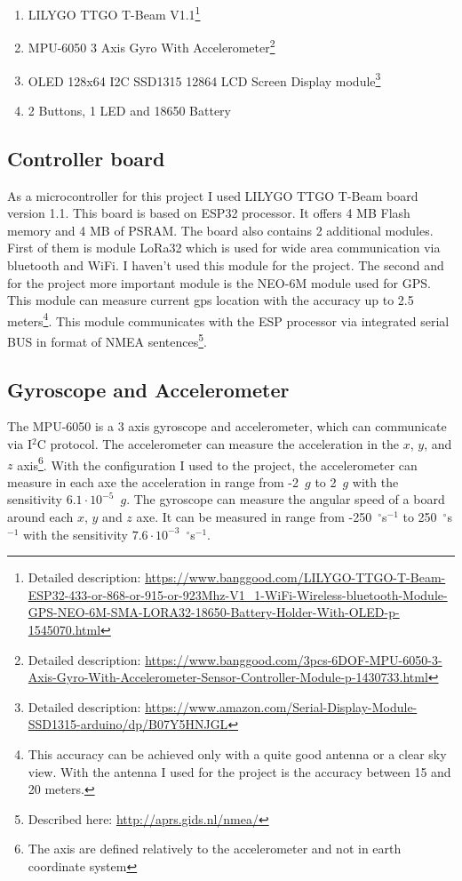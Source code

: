 \documentclass[hidelinks,a4paper]{article}
\begin{document}
\begin{enumerate}
    \item LILYGO TTGO T-Beam V1.1\footnote{Detailed description: \url{https://www.banggood.com/LILYGO-TTGO-T-Beam-ESP32-433-or-868-or-915-or-923Mhz-V1_1-WiFi-Wireless-bluetooth-Module-GPS-NEO-6M-SMA-LORA32-18650-Battery-Holder-With-OLED-p-1545070.html}}
    \item MPU-6050 3 Axis Gyro With Accelerometer\footnote{Detailed description: \url{https://www.banggood.com/3pcs-6DOF-MPU-6050-3-Axis-Gyro-With-Accelerometer-Sensor-Controller-Module-p-1430733.html}}
    \item OLED 128x64 I2C SSD1315 12864 LCD Screen Display module\footnote{Detailed description: \url{https://www.amazon.com/Serial-Display-Module-SSD1315-arduino/dp/B07Y5HNJGL}}
    \item 2 Buttons, 1 LED and 18650 Battery
\end{enumerate}

\subsection{Controller board}

As a microcontroller for this project I used LILYGO TTGO T-Beam board version 1.1. This board is based on ESP32 processor. It offers 4 MB Flash memory and 4 MB of PSRAM. The board also contains 2 additional modules. First of them is module LoRa32 which is used for wide area communication via bluetooth and WiFi. I haven't used this module for the project. The second and for the project more important module is the NEO-6M module used for GPS. This module can measure current gps location with the accuracy up to 2.5 meters\footnote{This accuracy can be achieved only with a quite good antenna or a clear sky view. With the antenna I used for the project is the accuracy between 15 and 20 meters.}. This module communicates with the ESP processor via integrated serial BUS in format of NMEA sentences\footnote{Described here: \url{http://aprs.gids.nl/nmea/}}.

\subsection{Gyroscope and Accelerometer}

The MPU-6050 is a 3 axis gyroscope and accelerometer, which can communicate via I${}^2$C protocol. The accelerometer can measure the acceleration in the $x$, $y$, and $z$ axis\footnote{The axis are defined relatively to the accelerometer and not in earth coordinate system}. With the configuration I used to the project, the accelerometer can measure in each axe the acceleration in range from -2~$g$ to 2~$g$ with the sensitivity $6.1 \cdot 10^{-5}$~$g$. The gyroscope can measure the angular speed of a board around each $x$, $y$ and $z$ axe. It can be measured in range from -250~${}^{\circ}$s${}^{-1}$ to 250~${}^{\circ}$s${}^{-1}$ with the sensitivity $7.6 \cdot 10^{-3}$~${}^{\circ}$s${}^{-1}$.
\end{document}
